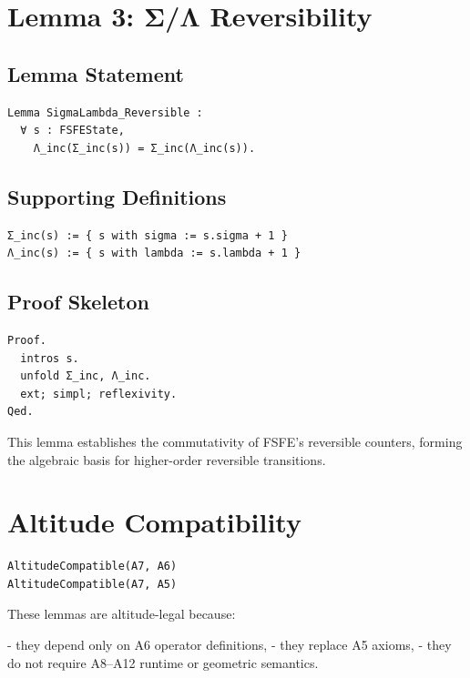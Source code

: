 \documentclass[11pt]{article}
\begin{document}
\section{Lemma 3: Σ/Λ Reversibility}

\subsection{Lemma Statement}

\begin{verbatim}
Lemma SigmaLambda_Reversible :
  ∀ s : FSFEState,
    Λ_inc(Σ_inc(s)) = Σ_inc(Λ_inc(s)).
\end{verbatim}

\subsection{Supporting Definitions}

\begin{verbatim}
Σ_inc(s) := { s with sigma := s.sigma + 1 }
Λ_inc(s) := { s with lambda := s.lambda + 1 }
\end{verbatim}

\subsection{Proof Skeleton}

\begin{verbatim}
Proof.
  intros s.
  unfold Σ_inc, Λ_inc.
  ext; simpl; reflexivity.
Qed.
\end{verbatim}

This lemma establishes the commutativity of FSFE’s reversible counters, forming
the algebraic basis for higher-order reversible transitions.

\newpage


\section{Altitude Compatibility}

\begin{verbatim}
AltitudeCompatible(A7, A6)
AltitudeCompatible(A7, A5)
\end{verbatim}

These lemmas are altitude-legal because:

- they depend only on A6 operator definitions,
- they replace A5 axioms,
- they do not require A8–A12 runtime or geometric semantics.
\end{document}
